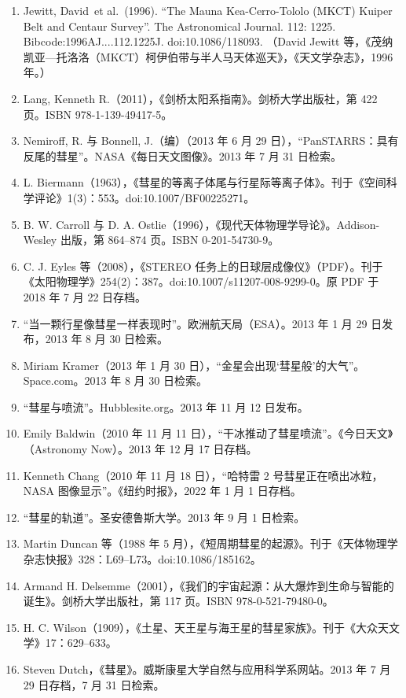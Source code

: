 \begin{enumerate}
（Michael E. Brown 等，《哈勃望远镜柯伊伯带天体搜索的统计分析》，《天体物理学杂志》，1997 年。）
\item Jewitt, David\ et al.\ (1996). “The Mauna Kea-Cerro-Tololo (MKCT) Kuiper Belt and Centaur Survey”. The Astronomical Journal. 112: 1225. Bibcode:1996AJ....112.1225J. doi:10.1086/118093.
（David Jewitt 等，《茂纳凯亚—托洛洛（MKCT）柯伊伯带与半人马天体巡天》，《天文学杂志》，1996 年。）
\item Lang, Kenneth R.（2011），《剑桥太阳系指南》。剑桥大学出版社，第 422 页。ISBN 978-1-139-49417-5。
\item Nemiroff, R. 与 Bonnell, J.（编）（2013 年 6 月 29 日），“PanSTARRS：具有反尾的彗星”。NASA《每日天文图像》。2013 年 7 月 31 日检索。
\item L. Biermann（1963），《彗星的等离子体尾与行星际等离子体》。刊于《空间科学评论》1(3)：553。doi:10.1007/BF00225271。
\item B. W. Carroll 与 D. A. Ostlie（1996），《现代天体物理学导论》。Addison-Wesley 出版，第 864–874 页。ISBN 0-201-54730-9。
\item C. J. Eyles 等（2008），《STEREO 任务上的日球层成像仪》（PDF）。刊于《太阳物理学》254(2)：387。doi:10.1007/s11207-008-9299-0。原 PDF 于 2018 年 7 月 22 日存档。
\item “当一颗行星像彗星一样表现时”。欧洲航天局（ESA）。2013 年 1 月 29 日发布，2013 年 8 月 30 日检索。
\item Miriam Kramer（2013 年 1 月 30 日），“金星会出现‘彗星般’的大气”。Space.com。2013 年 8 月 30 日检索。
\item “彗星与喷流”。Hubblesite.org。2013 年 11 月 12 日发布。
\item Emily Baldwin（2010 年 11 月 11 日），“干冰推动了彗星喷流”。《今日天文》（Astronomy Now）。2013 年 12 月 17 日存档。
\item Kenneth Chang（2010 年 11 月 18 日），“哈特雷 2 号彗星正在喷出冰粒，NASA 图像显示”。《纽约时报》，2022 年 1 月 1 日存档。
\item “彗星的轨道”。圣安德鲁斯大学。2013 年 9 月 1 日检索。
\item Martin Duncan 等（1988 年 5 月），《短周期彗星的起源》。刊于《天体物理学杂志快报》328：L69–L73。doi:10.1086/185162。
\item Armand H. Delsemme（2001），《我们的宇宙起源：从大爆炸到生命与智能的诞生》。剑桥大学出版社，第 117 页。ISBN 978-0-521-79480-0。
\item H. C. Wilson（1909），《土星、天王星与海王星的彗星家族》。刊于《大众天文学》17：629–633。
\item Steven Dutch，《彗星》。威斯康星大学自然与应用科学系网站。2013 年 7 月 29 日存档，7 月 31 日检索。

\end{enumerate}
